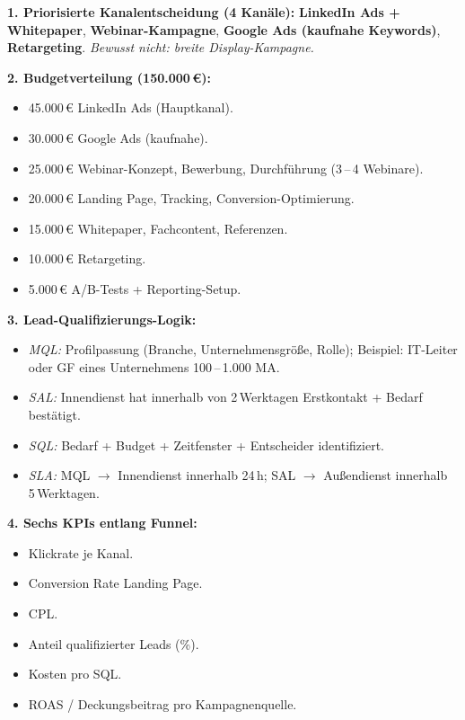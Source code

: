 \documentclass[11pt,a4paper,oneside]{article}
\begin{document}
\begin{loesungbox}
\textbf{1. Priorisierte Kanalentscheidung (4 Kanäle):}
\textbf{LinkedIn Ads + Whitepaper}, \textbf{Webinar-Kampagne}, \textbf{Google Ads (kaufnahe Keywords)}, \textbf{Retargeting}. \emph{Bewusst nicht: breite Display-Kampagne.}

\textbf{2. Budgetverteilung (150.000\,\euro):}
\begin{itemize}
  \item 45.000\,\euro{} \textendash{} LinkedIn Ads (Hauptkanal).
  \item 30.000\,\euro{} \textendash{} Google Ads (kaufnahe).
  \item 25.000\,\euro{} \textendash{} Webinar-Konzept, Bewerbung, Durchführung (3\,--\,4 Webinare).
  \item 20.000\,\euro{} \textendash{} Landing Page, Tracking, Conversion-Optimierung.
  \item 15.000\,\euro{} \textendash{} Whitepaper, Fachcontent, Referenzen.
  \item 10.000\,\euro{} \textendash{} Retargeting.
  \item 5.000\,\euro{} \textendash{} A/B-Tests + Reporting-Setup.
\end{itemize}

\textbf{3. Lead-Qualifizierungs-Logik:}
\begin{itemize}
  \item \emph{MQL:} Profilpassung (Branche, Unternehmensgröße, Rolle); Beispiel: IT-Leiter oder GF eines Unternehmens 100\,--\,1.000 MA.
  \item \emph{SAL:} Innendienst hat innerhalb von 2\,Werktagen Erstkontakt + Bedarf bestätigt.
  \item \emph{SQL:} Bedarf + Budget + Zeitfenster + Entscheider identifiziert.
  \item \emph{SLA:} MQL $\rightarrow$ Innendienst innerhalb 24\,h; SAL $\rightarrow$ Außendienst innerhalb 5\,Werktagen.
\end{itemize}

\textbf{4. Sechs KPIs entlang Funnel:}
\begin{itemize}
  \item Klickrate je Kanal.
  \item Conversion Rate Landing Page.
  \item CPL.
  \item Anteil qualifizierter Leads (\%).
  \item Kosten pro SQL.
  \item ROAS / Deckungsbeitrag pro Kampagnenquelle.
\end{itemize}


\end{loesungbox}
\end{document}
